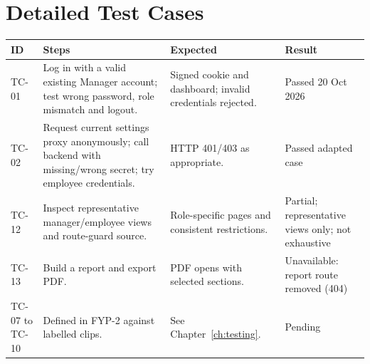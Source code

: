 \chapter{Detailed Test Cases}
\label{app:tests}
\begin{longtable}{P{0.09\textwidth}P{0.35\textwidth}P{0.3\textwidth}P{0.14\textwidth}}
\toprule
ID & Steps & Expected & Result\\
\midrule
\endhead
TC-01 & Log in with a valid existing Manager account; test wrong password, role mismatch and logout. & Signed cookie and dashboard; invalid credentials rejected. & Passed 20 Oct 2026\\
TC-02 & Request current settings proxy anonymously; call backend with missing/wrong secret; try employee credentials. & HTTP 401/403 as appropriate. & Passed adapted case\\
TC-12 & Inspect representative manager/employee views and route-guard source. & Role-specific pages and consistent restrictions. & Partial; representative views only; not exhaustive\\
TC-13 & Build a report and export PDF. & PDF opens with selected sections. & Unavailable: report route removed (404)\\
TC-07 to TC-10 & Defined in FYP-2 against labelled clips. & See Chapter~\ref{ch:testing}. & Pending\\
\bottomrule
\end{longtable}

